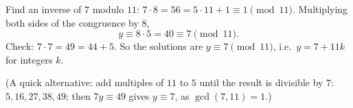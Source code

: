 Find an inverse of $7$ modulo $11$: $7\cdot8=56=5\cdot11+1\equiv1\pmod{11}$. Multiplying both sides of the congruence by $8$,
\[
y\equiv8\cdot5=40\equiv7\pmod{11}.
\]
Check: $7\cdot7=49=44+5$. So the solutions are $\boxed{y\equiv7\pmod{11}}$, i.e.\ $y=7+11k$ for integers $k$.

(A quick alternative: add multiples of $11$ to $5$ until the result is divisible by $7$: $5,16,27,38,49$; then $7y\equiv49$ gives $y\equiv7$, as $\gcd(7,11)=1$.)
